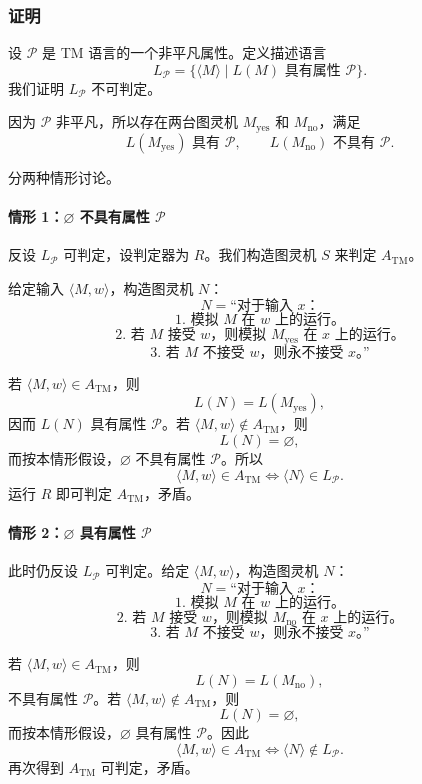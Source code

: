 \begin{answerred}
\subsubsection*{证明}

设 $\mathcal{P}$ 是 TM 语言的一个非平凡属性。定义描述语言
\[
L_{\mathcal{P}}
=
\{\langle M\rangle\mid L(M)\text{ 具有属性 }\mathcal{P}\}.
\]
我们证明 $L_{\mathcal{P}}$ 不可判定。

因为 $\mathcal{P}$ 非平凡，所以存在两台图灵机 $M_{\mathrm{yes}}$ 和 $M_{\mathrm{no}}$，满足
\[
L(M_{\mathrm{yes}})\text{ 具有 }\mathcal{P},
\qquad
L(M_{\mathrm{no}})\text{ 不具有 }\mathcal{P}.
\]

分两种情形讨论。

\paragraph{情形 1：$\varnothing$ 不具有属性 $\mathcal{P}$}
反设 $L_{\mathcal{P}}$ 可判定，设判定器为 $R$。我们构造图灵机 $S$ 来判定 $A_{\mathrm{TM}}$。

给定输入 $\langle M,w\rangle$，构造图灵机 $N$：
\[
N=\text{``对于输入 }x\text{：}
\]
\[
\text{1. 模拟 }M\text{ 在 }w\text{ 上的运行。}
\]
\[
\text{2. 若 }M\text{ 接受 }w\text{，则模拟 }M_{\mathrm{yes}}\text{ 在 }x\text{ 上的运行。}
\]
\[
\text{3. 若 }M\text{ 不接受 }w\text{，则永不接受 }x\text{。''}
\]

若 $\langle M,w\rangle\in A_{\mathrm{TM}}$，则
\[
L(N)=L(M_{\mathrm{yes}}),
\]
因而 $L(N)$ 具有属性 $\mathcal{P}$。若 $\langle M,w\rangle\notin A_{\mathrm{TM}}$，则
\[
L(N)=\varnothing,
\]
而按本情形假设，$\varnothing$ 不具有属性 $\mathcal{P}$。所以
\[
\langle M,w\rangle\in A_{\mathrm{TM}}
\iff
\langle N\rangle\in L_{\mathcal{P}}.
\]
运行 $R$ 即可判定 $A_{\mathrm{TM}}$，矛盾。

\paragraph{情形 2：$\varnothing$ 具有属性 $\mathcal{P}$}
此时仍反设 $L_{\mathcal{P}}$ 可判定。给定 $\langle M,w\rangle$，构造图灵机 $N$：
\[
N=\text{``对于输入 }x\text{：}
\]
\[
\text{1. 模拟 }M\text{ 在 }w\text{ 上的运行。}
\]
\[
\text{2. 若 }M\text{ 接受 }w\text{，则模拟 }M_{\mathrm{no}}\text{ 在 }x\text{ 上的运行。}
\]
\[
\text{3. 若 }M\text{ 不接受 }w\text{，则永不接受 }x\text{。''}
\]

若 $\langle M,w\rangle\in A_{\mathrm{TM}}$，则
\[
L(N)=L(M_{\mathrm{no}}),
\]
不具有属性 $\mathcal{P}$。若 $\langle M,w\rangle\notin A_{\mathrm{TM}}$，则
\[
L(N)=\varnothing,
\]
而按本情形假设，$\varnothing$ 具有属性 $\mathcal{P}$。因此
\[
\langle M,w\rangle\in A_{\mathrm{TM}}
\iff
\langle N\rangle\notin L_{\mathcal{P}}.
\]
再次得到 $A_{\mathrm{TM}}$ 可判定，矛盾。


\end{answerred}
